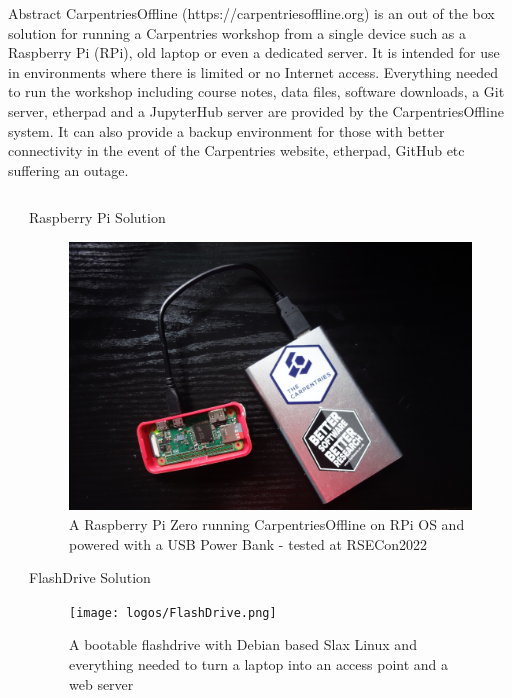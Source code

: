 \documentclass[final,20pt]{beamer}
\newlength{\sepwidth}
\newlength{\colwidth}
\newcommand{\separatorcolumn}{\begin{column}{\sepwidth}\end{column}}
\begin{document}
	\begin{frame}[t]
		\begin{block}{\large Abstract}	
			CarpentriesOffline (https://carpentriesoffline.org) is an out of the box solution for running a Carpentries workshop from a single device such as a Raspberry Pi (RPi), old laptop or even a dedicated server. It is intended for use in environments where there is limited or no Internet access. Everything needed to run the workshop including course notes, data files, software downloads, a Git server, etherpad and a JupyterHub server are provided by the CarpentriesOffline system. It can also provide a backup environment for those with better connectivity in the event of the Carpentries website, etherpad, GitHub etc suffering an outage.
		\end{block}
		\vfill
		\begin{columns}[t]
			\separatorcolumn
			\begin{column}{\colwidth}
				\begin{block}{Raspberry Pi Solution}
					\begin{center}
						\begin{figure}
							\includegraphics[width=0.6\columnwidth]{logos/CarpentriesOfflinePhoto.png}
							\caption{A Raspberry Pi Zero running CarpentriesOffline on RPi OS and powered with a USB Power Bank - tested at RSECon2022}
						\end{figure}
					\end{center}
				\end{block}
				\begin{block}{FlashDrive Solution}
					\begin{figure}
						\begin{center}
							\texttt{[image: logos/FlashDrive.png]}
							\caption{A bootable flashdrive with Debian based Slax Linux and everything needed to turn a laptop into an access point and a web server}
						\end{center}
					\end{figure}


\end{block}
\end{column}
\end{columns}
\end{frame}
\end{document}
